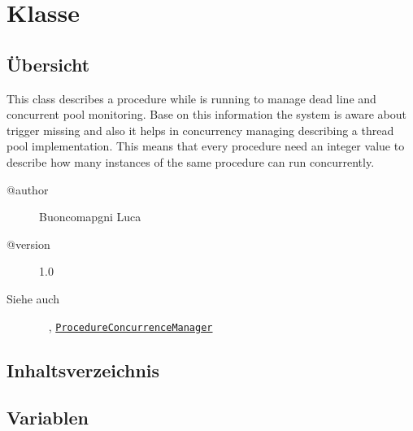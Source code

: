 
\section[ProcedureConcurrenceData]{Klasse }\label{ontologyFramework.OFProcedureManagment.ProcedureConcurrenceData-class}
\subsection{Übersicht}
This class describes a procedure while is running to 
 manage dead line and concurrent pool monitoring.
 Base on this information the system is aware about
 trigger missing and also it helps in concurrency managing 
 describing a thread pool implementation. This means that every
 procedure need an integer value to describe how many
 instances of the same procedure can run concurrently.
\begin{description}
\item[@author] 
Buoncomapgni Luca
\item[@version] 
1.0
\item[Siehe auch] ~
\noprint, \texttt{\hyperlink{ontologyFramework.OFProcedureManagment.ProcedureConcurrenceManager-class}{ProcedureConcurrenceManager}}\end{description}
\subsection{Inhaltsverzeichnis}
\subsection{Variablen}
\begin{description}
\item[{\label{ontologyFramework.OFProcedureManagment.ProcedureConcurrenceData.NAMEID_symbSeparator}}]
~ 
\end{description}
